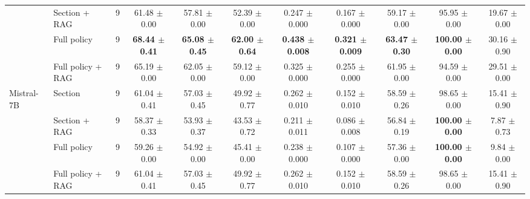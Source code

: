 \begin{table}[!t]
{\begin{tabular}{llrcccccccc}
 & Section + RAG & 9 & 61.48 $\pm$ 0.00 & 57.81 $\pm$ 0.00 & 52.39 $\pm$ 0.00 & 0.247 $\pm$ 0.000 & 0.167 $\pm$ 0.000 & 59.17 $\pm$ 0.00 & 95.95 $\pm$ 0.00 & 19.67 $\pm$ 0.00 \\
 & Full policy & 9 & \textbf{68.44 $\pm$ 0.41} & \textbf{65.08 $\pm$ 0.45} & \textbf{62.00 $\pm$ 0.64} & \textbf{0.438 $\pm$ 0.008} & \textbf{0.321 $\pm$ 0.009} & \textbf{63.47 $\pm$ 0.30} & \textbf{100.00 $\pm$ 0.00} & 30.16 $\pm$ 0.90 \\
 & Full policy + RAG & 9 & 65.19 $\pm$ 0.00 & 62.05 $\pm$ 0.00 & 59.12 $\pm$ 0.00 & 0.325 $\pm$ 0.000 & 0.255 $\pm$ 0.000 & 61.95 $\pm$ 0.00 & 94.59 $\pm$ 0.00 & 29.51 $\pm$ 0.00 \\
\midrule
Mistral-7B & Section & 9 & 61.04 $\pm$ 0.41 & 57.03 $\pm$ 0.45 & 49.92 $\pm$ 0.77 & 0.262 $\pm$ 0.010 & 0.152 $\pm$ 0.010 & 58.59 $\pm$ 0.26 & 98.65 $\pm$ 0.00 & 15.41 $\pm$ 0.90 \\
 & Section + RAG & 9 & 58.37 $\pm$ 0.33 & 53.93 $\pm$ 0.37 & 43.53 $\pm$ 0.72 & 0.211 $\pm$ 0.011 & 0.086 $\pm$ 0.008 & 56.84 $\pm$ 0.19 & \textbf{100.00 $\pm$ 0.00} & 7.87 $\pm$ 0.73 \\
 & Full policy & 9 & 59.26 $\pm$ 0.00 & 54.92 $\pm$ 0.00 & 45.41 $\pm$ 0.00 & 0.238 $\pm$ 0.000 & 0.107 $\pm$ 0.000 & 57.36 $\pm$ 0.00 & \textbf{100.00 $\pm$ 0.00} & 9.84 $\pm$ 0.00 \\
 & Full policy + RAG & 9 & 61.04 $\pm$ 0.41 & 57.03 $\pm$ 0.45 & 49.92 $\pm$ 0.77 & 0.262 $\pm$ 0.010 & 0.152 $\pm$ 0.010 & 58.59 $\pm$ 0.26 & 98.65 $\pm$ 0.00 & 15.41 $\pm$ 0.90 \\
\bottomrule
\end{tabular}
}
\end{table}
